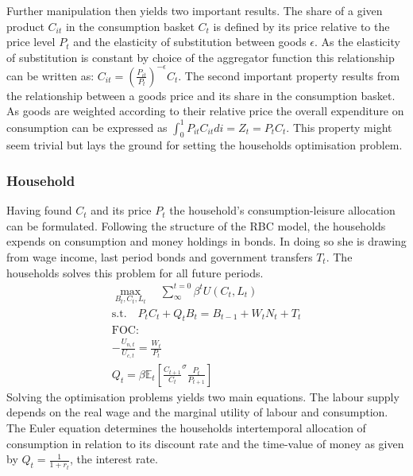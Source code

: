 \documentclass[12pt,a4paper,english]{article} %
\newcommand{\E}{\mathbb{E}} %
\begin{document}
	Further manipulation then yields two important results. The share of a given product $C_{it}$ in the consumption basket $C_t$ is defined by its price relative to the price level $P_t$ and the elasticity of substitution between goods $\epsilon$. As the elasticity of substitution is constant by choice of the aggregator function this relationship can be written as: $C_{it} = \left( \frac{P_{it}}{P_t} \right)^{- \epsilon} C_t$. The second important property results from the relationship between a goods price and its share in the consumption basket. As goods are weighted according to their relative price the overall expenditure on consumption can be expressed as $\int_{0}^{1} P_{it} C_{it} di = Z_t = P_t C_t$. This property might seem trivial but lays the ground for setting the households optimisation problem. 
	
	\subsubsection{Household}
	Having found $C_t$ and its price $P_t$ the household's consumption-leisure allocation can be formulated. Following the structure of the RBC model, the households expends on consumption and money holdings in bonds. In doing so she is drawing from wage income, last period bonds and government transfers $T_t$. The households solves this problem for all future periods.
	\begin{equation}
		\begin{aligned}
			\max_{B_t, C_t, L_t} \quad \sum_{\infty}^{t=0} \beta^{t} U(C_{t}, L_{t}) \\
			\textrm{s.t.} \quad P_t C_t + Q_t B_t = B_{t-1} + W_t N_t + T_t \\
			\textrm{FOC:} \\
				- \frac{U_{n,t}}{U_{c, t}} = \frac{W_t}{P_t}\\
				Q_t = \beta \E_t \left[ \frac{C_{t+1}}{C_t}^\sigma \frac{P_t}{P_{t+1}} \right] 			
		\end{aligned}
	\end{equation}
	Solving the optimisation problems yields two main equations. The labour supply depends on the real wage and the marginal utility of labour and consumption. The Euler equation determines the households intertemporal allocation of consumption in relation to its discount rate and the time-value of money as given by $Q_t = \frac{1}{1+r_t}$, the interest rate.
\end{document}
